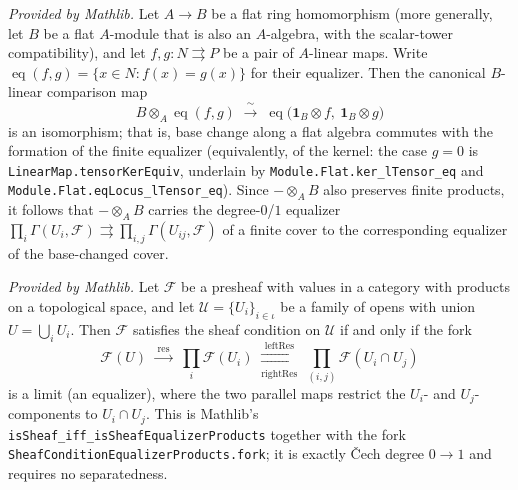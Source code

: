 \begin{lemma}
  \label{lem:flat_preserves_equalizer_mathlib}
  \mathlibok
  \textit{Provided by Mathlib.}
  Let \(A \to B\) be a flat ring homomorphism (more generally, let \(B\) be a flat
  \(A\)-module that is also an \(A\)-algebra, with the scalar-tower compatibility),
  and let \(f, g : N \rightrightarrows P\) be a pair of \(A\)-linear maps. Write
  \(\operatorname{eq}(f, g) = \{x \in N : f(x) = g(x)\}\) for their equalizer. Then the
  canonical \(B\)-linear comparison map
  \[
    B \otimes_A \operatorname{eq}(f, g)
    \;\xrightarrow{\ \sim\ }\;
    \operatorname{eq}\bigl(\mathbf{1}_B \otimes f,\ \mathbf{1}_B \otimes g\bigr)
  \]
  is an isomorphism; that is, base change along a flat algebra commutes with the
  formation of the finite equalizer (equivalently, of the kernel: the case
  \(g = 0\) is \texttt{LinearMap.tensorKerEquiv}, underlain by
  \texttt{Module.Flat.ker\_lTensor\_eq} and \texttt{Module.Flat.eqLocus\_lTensor\_eq}).
  Since \(- \otimes_A B\) also preserves finite products, it follows that
  \(- \otimes_A B\) carries the degree-\(0\)/\(1\) equalizer
  \(\prod_i \Gamma(U_i, \mathcal{F}) \rightrightarrows
    \prod_{i,j} \Gamma(U_{ij}, \mathcal{F})\) of a finite cover to the corresponding
  equalizer of the base-changed cover.
\end{lemma}

\begin{lemma}
  \label{lem:sheaf_equalizer_products_mathlib}
  \mathlibok
  \textit{Provided by Mathlib.}
  Let \(\mathcal{F}\) be a presheaf with values in a category with products on a
  topological space, and let \(\mathcal{U} = \{U_i\}_{i \in \iota}\) be a family of
  opens with union \(U = \bigcup_i U_i\). Then \(\mathcal{F}\) satisfies the sheaf
  condition on \(\mathcal{U}\) if and only if the fork
  \[
    \mathcal{F}(U)
    \;\xrightarrow{\;\mathrm{res}\;}\;
    \prod_i \mathcal{F}(U_i)
    \;\underset{\mathrm{rightRes}}{\overset{\mathrm{leftRes}}{\rightrightarrows}}\;
    \prod_{(i,j)} \mathcal{F}(U_i \cap U_j)
  \]
  is a limit (an equalizer), where the two parallel maps restrict the \(U_i\)- and
  \(U_j\)-components to \(U_i \cap U_j\). This is Mathlib's
  \texttt{isSheaf\_iff\_isSheafEqualizerProducts} together with the fork
  \texttt{SheafConditionEqualizerProducts.fork}; it is exactly Čech degree
  \(0 \to 1\) and requires no separatedness.
\end{lemma}

